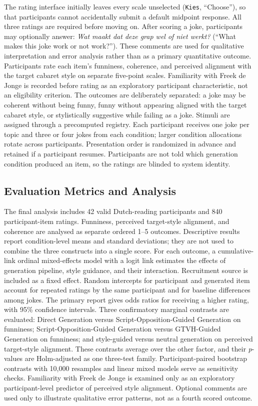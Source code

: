 \documentclass[11pt]{article}
\begin{document}
The rating interface initially leaves every scale unselected (\texttt{Kies}, ``Choose''), so that participants cannot accidentally submit a default midpoint response. All three ratings are required before moving on. After scoring a joke, participants may optionally answer: \emph{Wat maakt dat deze grap wel of niet werkt?} (``What makes this joke work or not work?''). These comments are used for qualitative interpretation and error analysis rather than as a primary quantitative outcome. Participants rate each item's funniness, coherence, and perceived alignment with the target cabaret style on separate five-point scales. Familiarity with Freek de Jonge is recorded before rating as an exploratory participant characteristic, not an eligibility criterion. The outcomes are deliberately separated: a joke may be coherent without being funny, funny without appearing aligned with the target cabaret style, or stylistically suggestive while failing as a joke. Stimuli are assigned through a precomputed registry. Each participant receives one joke per topic and three or four jokes from each condition; larger condition allocations rotate across participants. Presentation order is randomized in advance and retained if a participant resumes. Participants are not told which generation condition produced an item, so the ratings are blinded to system identity.

\subsection{Evaluation Metrics and Analysis}\label{evaluation-metrics-and-analysis}

The final analysis includes 42 valid Dutch-reading participants and 840 participant-item ratings. Funniness, perceived target-style alignment, and coherence are analysed as separate ordered 1--5 outcomes. Descriptive results report condition-level means and standard deviations; they are not used to combine the three constructs into a single score. For each outcome, a cumulative-link ordinal mixed-effects model with a logit link estimates the effects of generation pipeline, style guidance, and their interaction. Recruitment source is included as a fixed effect. Random intercepts for participant and generated item account for repeated ratings by the same participant and for baseline differences among jokes. The primary report gives odds ratios for receiving a higher rating, with 95\% confidence intervals. Three confirmatory marginal contrasts are evaluated: Direct Generation versus Script-Opposition-Guided Generation on funniness; Script-Opposition-Guided Generation versus GTVH-Guided Generation on funniness; and style-guided versus neutral generation on perceived target-style alignment. These contrasts average over the other factor, and their \emph{p}-values are Holm-adjusted as one three-test family. Participant-paired bootstrap contrasts with 10,000 resamples and linear mixed models serve as sensitivity checks. Familiarity with Freek de Jonge is examined only as an exploratory participant-level predictor of perceived style alignment. Optional comments are used only to illustrate qualitative error patterns, not as a fourth scored outcome.
\end{document}
